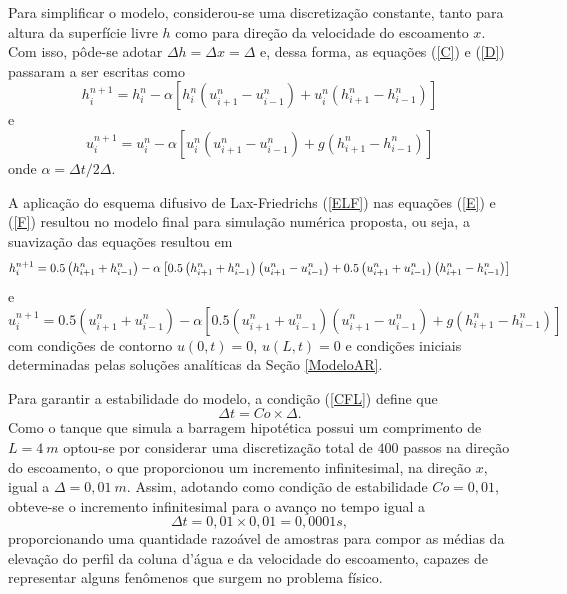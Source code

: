 Para simplificar o modelo, considerou-se uma discretização constante, tanto para altura da superfície livre $h$ como para direção da velocidade do escoamento $x$. Com isso, pôde-se adotar $ \Delta h = \Delta x = \Delta$ e, dessa forma, as equações (\ref{C}) e (\ref{D}) passaram a ser escritas como
\begin{equation} \label{E}
h^{n+1}_{i} =  h^{n}_{i} - \alpha \left[h^{n}_{i} \left( u^{n}_{i+1}-u^{n}_{i-1} \right) + u^{n}_{i} \left( h^{n}_{i+1}-h^{n}_{i-1} \right) \right]
\end{equation}
e
\begin{equation} \label{F}
u^{n+1}_{i} = u^{n}_{i} - \alpha \left[u^{n}_{i} \left( u^{n}_{i+1}-u^{n}_{i-1} \right) + g \left( h^{n}_{i+1}-h^{n}_{i-1} \right) \right]
\end{equation}
onde $ \alpha = { \Delta t}/{2 \Delta}$.

A aplicação do esquema difusivo de Lax-Friedrichs (\ref{ELF}) nas equações (\ref{E}) e (\ref{F}) resultou no modelo final para simulação numérica proposta, ou seja, a suavização das equações resultou em
\begin{equation} \label{G}
	\small{ h^{n+1}_{i} =0.5 \left( h^{n}_{i+1}+h^{n}_{i-1} \right)  - \alpha \left[ 0.5 \left( h^{n}_{i+1}+h^{n}_{i-1} \right) \left( u^{n}_{i+1}-u^{n}_{i-1} \right)  + 0.5 \left( u^{n}_{i+1}+u^{n}_{i-1} \right) \left( h^{n}_{i+1}-h^{n}_{i-1} \right) \right] }
\end{equation}
e
\begin{equation} \label{H}
	u^{n+1}_{i} =0.5 \left( u^{n}_{i+1}+u^{n}_{i-1} \right) - \alpha \left[ 0.5 \left( u^{n}_{i+1}+u^{n}_{i-1} \right) \left( u^{n}_{i+1}-u^{n}_{i-1} \right) + g \left( h^{n}_{i+1}-h^{n}_{i-1} \right) \right]
\end{equation}
com condições de contorno $u(0,t)=0$, $u(L,t)=0$ e condições iniciais determinadas pelas soluções analíticas da Seção \ref{ModeloAR}.

Para garantir a estabilidade do modelo, a condição (\ref{CFL}) define que
\begin{equation}
\Delta t = Co \times \Delta.
\end{equation}
Como o tanque que simula a barragem hipotética possui um comprimento de $L=4 \ m$ optou-se por considerar uma discretização total de $400$ passos na direção do escoamento, o que proporcionou um incremento infinitesimal, na direção $x$,  igual a $ \Delta = 0,01 \ m$. Assim, adotando como condição de estabilidade $Co=0,01$, obteve-se o incremento infinitesimal para o avanço no tempo igual a
\begin{equation}
\Delta t = 0,01 \times 0,01 = 0,0001s,
\end{equation}
proporcionando uma quantidade razoável de amostras para compor as médias da elevação do perfil da coluna d'água e da velocidade do escoamento, capazes de representar alguns fenômenos que surgem no problema físico. 

      











